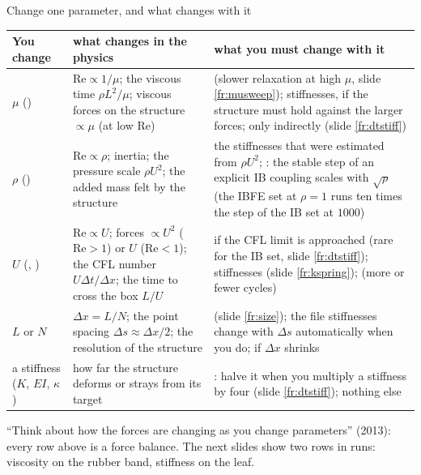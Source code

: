 \documentclass[aspectratio=169,11pt]{beamer}
\begin{document}
\begin{frame}{Change one parameter, and what changes with it}
\label{fr:propagate}
\scriptsize
\setlength{\tabcolsep}{3pt}
\begin{tabular}{@{}L{0.14\textwidth}L{0.36\textwidth}L{0.42\textwidth}@{}}
\toprule
You change & what changes in the physics & what you must change with it\\
\midrule
$\mu$ () & $\mathrm{Re} \propto 1/\mu$; the viscous time $\rho L^2/\mu$; viscous forces on the structure $\propto \mu$ (at low $\mathrm{Re}$) &  (slower relaxation at high $\mu$, slide \ref{fr:musweep}); stiffnesses, if the structure must hold against the larger forces;  only indirectly (slide \ref{fr:dtstiff})\\
$\rho$ () & $\mathrm{Re} \propto \rho$; inertia; the pressure scale $\rho U^2$; the added mass felt by the structure & the stiffnesses that were estimated from $\rho U^2$; : the stable step of an explicit IB coupling scales with $\sqrt{\rho}$ (the IBFE set at $\rho = 1$ runs ten times the step of the IB set at $1000$)\\
$U$ (, ) & $\mathrm{Re} \propto U$; forces $\propto U^2$ ($\mathrm{Re} > 1$) or $U$ ($\mathrm{Re} < 1$); the CFL number $U\Delta t/\Delta x$; the time to cross the box $L/U$ &  if the CFL limit is approached (rare for the IB set, slide \ref{fr:dtstiff}); stiffnesses (slide \ref{fr:kspring});  (more or fewer cycles)\\
$L$ or $N$ & $\Delta x = L/N$; the point spacing $\Delta s \approx \Delta x/2$; the resolution of the structure &  (slide \ref{fr:size}); the file stiffnesses change with $\Delta s$ automatically when you do;  if $\Delta x$ shrinks\\
a stiffness ($K$, $EI$, $\kappa$) & how far the structure deforms or strays from its target & : halve it when you multiply a stiffness by four (slide \ref{fr:dtstiff}); nothing else\\
\bottomrule
\end{tabular}

\vspace{2mm}
\small ``Think about how the forces are changing as you change parameters'' (2013): every row above is a force balance. The next slides show two rows in runs: viscosity on the rubber band, stiffness on the leaf.
\end{frame}
\end{document}

